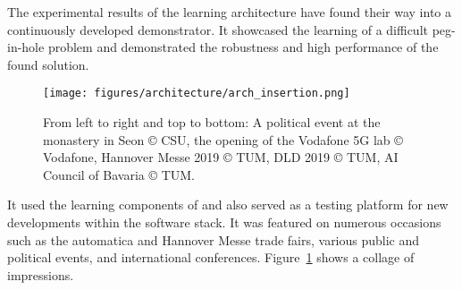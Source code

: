 The experimental results of the learning architecture have found their way into a continuously developed demonstrator.
It showcased the learning of a difficult peg-in-hole problem and demonstrated the robustness and high performance of the found solution.

\begin{figure}[ht!]
    \texttt{[image: figures/architecture/arch\_insertion.png]}
    \caption{From left to right and top to bottom: A political event at the monastery in Seon \copyright{} CSU, the opening of the Vodafone 5G lab \copyright{} Vodafone, Hannover Messe 2019 \copyright{} TUM, DLD 2019 \copyright{} TUM, AI Council of Bavaria \copyright{} TUM.}
    \label{fig:architecture:insertion}
\end{figure}

It used the learning components of \softwareabbr{} and also served as a testing platform for new developments within the software stack.
It was featured on numerous occasions such as the automatica and Hannover Messe trade fairs, various public and political events, and international conferences.
Figure~\ref{fig:architecture:insertion} shows a collage of impressions.

